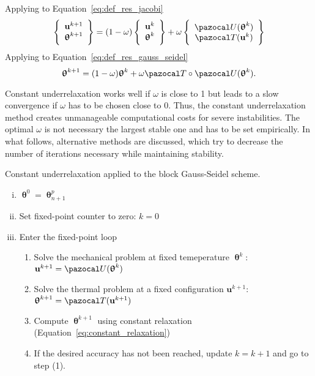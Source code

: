 Applying to Equation~\eqref{eq:def_res_jacobi}
\begin{equation}
  \left\{\begin{array}{c}
    \mathbf u^{k+1}\\
    \bm \uptheta^{k+1}
  \end{array}\right\} =
  (1-\omega)
  \left\{\begin{array}{c}
    \mathbf u^{k}\\
    \bm \uptheta^{k}
  \end{array}\right\}
  + \omega
  \left\{\begin{array}{c}
    \pazocal U(\bm\uptheta^k)\\
    \pazocal T(\mathbf u^k)
  \end{array}\right\}
\end{equation}
Applying to Equation~\eqref{eq:def_res_gauss_seidel}
\begin{equation}
  \bm\uptheta^{k+1} = (1-\omega)\bm\uptheta^k + \omega \pazocal T\circ\pazocal U(\bm \uptheta^k).
\end{equation}


Constant underrelaxation works well if \(\omega\) is close to 1 but leads to a slow convergence if \(\omega\) has to be chosen close to 0.
Thus, the constant underrelaxation method creates unmanageable computational costs for severe instabilities.
The optimal \(\omega\) is not necessary the largest stable one \citep{gatzhammer_efficient_2014} and has to be set empirically.
In what follows, alternative methods are discussed, which try to decrease the number of iterations necessary while maintaining stability.

\begin{framedbox}[htb]
  \caption{Constant underrelaxation applied to the block Gauss-Seidel scheme.}
  \label{box:constant_underrelaxation}
  \begin{center}
    \begin{minipage}{0.9\textwidth}
    \begin{enumerate}[(i)]
    \item \(\bm\uptheta^0 = \bm\uptheta_{n+1}^p\)
    \item Set fixed-point counter to zero: \(k=0\)
    \item Enter the fixed-point loop
    \begin{enumerate}[(1)]
      \item Solve the mechanical problem at fixed temeperature \(\bm \uptheta^k\): \(\mathbf u^{k+1} = \pazocal U(\bm \uptheta^k)\)
      \item Solve the thermal problem at a fixed configuration \(\mathbf u^{k+1}\): \(\bm \uptheta^{k+1} = \pazocal T(\mathbf u^{k+1})\)
      \item Compute \(\bm \uptheta^{k+1}\) using constant relaxation (Equation~\eqref{eq:constant_relaxation})
      \item If the desired accuracy has not been reached, update \(k=k+1\) and go to step (1).
    \end{enumerate}
    \end{enumerate}
    \end{minipage}
  \end{center}
\end{framedbox}

